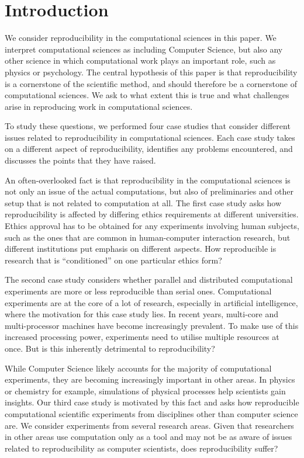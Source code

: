 \section{Introduction}
\label{s:intro}


We consider reproducibility in the computational sciences in this paper.  We
interpret computational sciences as including Computer Science, but also any
other science in which computational work plays an important role, such as
physics or psychology. The central hypothesis of this paper is that
reproducibility is a cornerstone of the scientific method, and should therefore
be a cornerstone of computational sciences. We ask to what extent this is true
and what challenges arise in reproducing work in computational sciences.

To study these questions, we performed four case studies that consider different
issues related to reproducibility in computational sciences.  Each case study
takes on a different aspect of reproducibility, identifies any problems
encountered, and discusses the points that they have raised.

An often-overlooked fact is that reproducibility in the computational sciences
is not only an issue of the actual computations, but also of preliminaries and
other setup that is not related to computation at all. The first case study asks
how reproducibility is affected by differing ethics requirements at different
universities. Ethics approval has to be obtained for any experiments involving
human subjects, such as the ones that are common in human-computer interaction
research, but different institutions put emphasis on different aspects. How
reproducible is research that is ``conditioned'' on one particular ethics form?

The second case study considers whether parallel and distributed computational
experiments are more or less reproducible than serial ones. Computational
experiments are at the core of a lot of research, especially in artificial
intelligence, where the motivation for this case study lies. In recent years,
multi-core and multi-processor machines have become increasingly prevalent. To
make use of this increased processing power, experiments need to utilise
multiple resources at once. But is this inherently detrimental to
reproducibility?

While Computer Science likely accounts for the majority of computational
experiments, they are becoming increasingly important in other areas. In physics
or chemistry for example, simulations of physical processes help scientists gain
insights. Our third case study is motivated by this fact and asks how
reproducible computational scientific experiments from disciplines other than
computer science are. We consider experiments from several research areas. Given
that researchers in other areas use computation only as a tool and may not be
as aware of issues related to reproducibility as computer scientists, does
reproducibility suffer?

